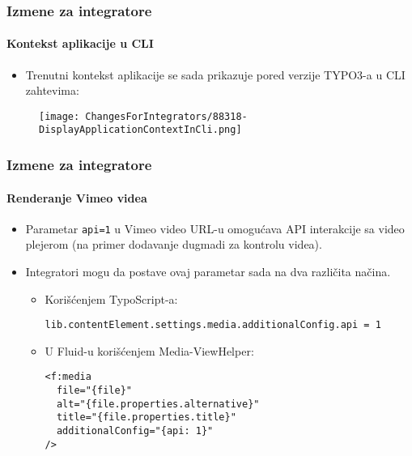 
\begin{frame}[fragile]
	\frametitle{Izmene za integratore}
	\framesubtitle{Kontekst aplikacije u CLI}

	\begin{itemize}
		\item Trenutni kontekst aplikacije se sada prikazuje pored verzije TYPO3-a u
			CLI zahtevima:
	\end{itemize}

	\begin{figure}
		\texttt{[image: ChangesForIntegrators/88318-DisplayApplicationContextInCli.png]}
	\end{figure}

\end{frame}


\begin{frame}[fragile]
	\frametitle{Izmene za integratore}
	\framesubtitle{Renderanje Vimeo videa}

	\lstset{basicstyle=\smaller\ttfamily}

	\begin{itemize}
		\item Parametar \texttt{api=1} u Vimeo video URL-u omogućava API interakcije
			sa video plejerom (na primer dodavanje dugmadi za kontrolu videa).
		\item Integratori mogu da postave ovaj parametar sada na dva različita načina.

		\begin{itemize}
			\item Korišćenjem TypoScript-a:

\begin{lstlisting}
lib.contentElement.settings.media.additionalConfig.api = 1
\end{lstlisting}

			\item U Fluid-u korišćenjem Media-ViewHelper:

\begin{lstlisting}
<f:media
  file="{file}"
  alt="{file.properties.alternative}"
  title="{file.properties.title}"
  additionalConfig="{api: 1}"
/>
\end{lstlisting}

		\end{itemize}
	\end{itemize}

\end{frame}

